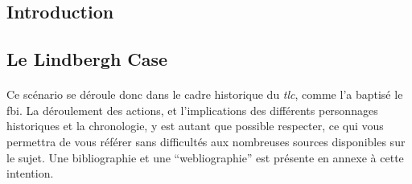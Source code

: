 \subsection{Introduction}
\subsection{Le Lindbergh Case}
\paragraph{} Ce scénario se déroule donc dans le cadre historique du \emph{\gls{tlc}}, comme l'a baptisé le
\gls{fbi}. La déroulement des actions, et l'implications des différents personnages historiques et la chronologie, y est 
autant que possible respecter, ce qui vous permettra de vous référer sans difficultés aux nombreuses sources disponibles
sur le sujet. Une bibliographie et une ``webliographie'' est présente en annexe à cette intention.
